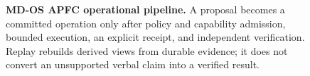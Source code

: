 \begin{figure}[!t]
\centering
\resizebox{\textwidth}{!}{}
\caption{\textbf{MD-OS APFC operational pipeline.}
A proposal becomes a committed operation only after policy and capability
admission, bounded execution, an explicit receipt, and independent verification.
Replay rebuilds derived views from durable evidence; it does not convert an
unsupported verbal claim into a verified result.}
\label{fig:system-pipeline}
\end{figure}
